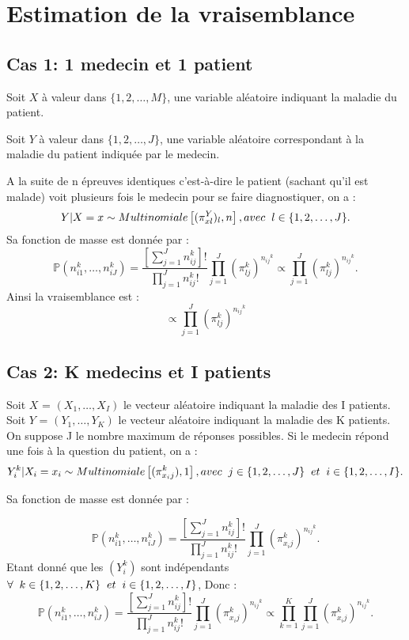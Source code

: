\documentclass[a4paper,french,10pt]{article}
\begin{document}
	\section{Estimation de la vraisemblance}
	\subsection{Cas 1: 1 medecin et 1 patient}
	
	Soit $X$ à valeur dans $\{1, 2, \dots ,M\}$, une variable aléatoire indiquant la maladie du patient.
	
	Soit $Y$ à valeur dans $\{1, 2, \dots ,J\}$, une variable aléatoire correspondant à la maladie du patient indiquée par le medecin.
	
	A la suite de n épreuves identiques c'est-à-dire le patient (sachant qu'il est malade) voit plusieurs fois le medecin pour se faire diagnostiquer, on a :
	\[Y | X=x \sim Multinomiale \left[(\pi_{xl}^Y)_{l}, n\right], avec\hspace{2mm}l \in \{1, 2, \dots,J\} .\]
	Sa fonction de masse est donnée par : \[\mathbb{P}\left(n_{i1}^k, \dots, n_{iJ}^k\right) = \frac{\left[\sum_{j=1}^{J} n_{ij}^k\right]!}{\prod_{j=1}^{J} n_{ij}^k !} \prod_{j=1}^{J} \left(\pi_{lj}^k\right)^{{n_{ij}}^{k}} \propto \prod_{j=1}^{J} \left(\pi_{lj}^k\right)^{{n_{ij}}^{k}}.\]
	Ainsi la vraisemblance est : \[\propto \prod_{j=1}^{J} \left(\pi_{lj}^k\right)^{{n_{ij}}^{k}}\]
	
	\subsection{Cas 2: K medecins et I patients}
	
	Soit $X$ = $(X_1, \dots, X_I)$ le vecteur aléatoire indiquant la maladie des I patients.\\
	Soit $Y$ = $(Y_1, \dots, Y_K)$ le vecteur aléatoire indiquant la maladie des K patients.\\
	On suppose J le nombre maximum de réponses possibles. Si le medecin répond une fois à la question du patient, on a : 	\[Y_{i}^k | X_i=x_i \sim Multinomiale \left[(\pi_{x_ij}^k), 1\right], avec\hspace{2mm}j \in \{1, 2, \dots,J\}\hspace{2mm} et\hspace{2mm} i \in \{1, 2, \dots,I\} .\]
	
	
	Sa fonction de masse est donnée par :
	
	\[\mathbb{P}\left(n_{i1}^k, \dots, n_{iJ}^k\right) = \frac{\left[\sum_{j=1}^{J} n_{ij}^k\right]!}{\prod_{j=1}^{J} n_{ij}^k !} \prod_{j=1}^{J} \left(\pi_{x_ij}^k\right)^{{n_{ij}}^{k}} .\]
	Etant donné que les $(Y_{i}^k)$ sont indépendants $ \forall\hspace{2mm}k \in \{1, 2, \dots,K\}\hspace{2mm} et\hspace{2mm} i \in \{1, 2, \dots,I\}$, Donc : \[\mathbb{P}\left(n_{i1}^k, \dots, n_{iJ}^k\right) = \frac{\left[\sum_{j=1}^{J} n_{ij}^k\right]!}{\prod_{j=1}^{J} n_{ij}^k !} \prod_{j=1}^{J} \left(\pi_{x_ij}^k\right)^{{n_{ij}}^{k}} \propto \prod_{k=1}^{K} \prod_{j=1}^{J} \left(\pi_{x_ij}^k\right)^{{n_{ij}}^{k}}.\]
	
\end{document}
